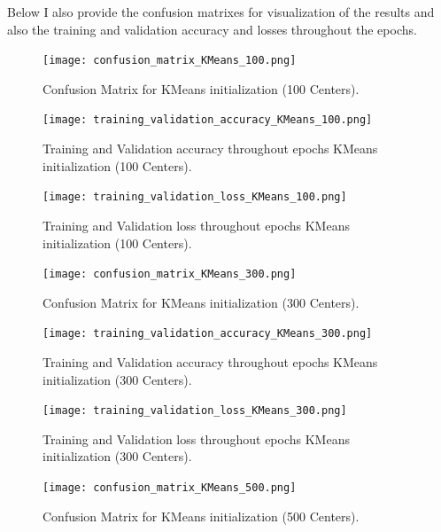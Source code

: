 \documentclass[lettersize,journal]{IEEEtran}
\begin{document}
Below I also provide the confusion matrixes for visualization of the results and also the training and validation accuracy and losses throughout the epochs.
\begin{figure}[H]
    \centering
    \texttt{[image: confusion\_matrix\_KMeans\_100.png]}
    \caption{Confusion Matrix for KMeans initialization (100 Centers).}
    \label{fig:confusion-matrix-KMeans100}
\end{figure}

\begin{figure}[H]
    \centering
    \texttt{[image: training\_validation\_accuracy\_KMeans\_100.png]}
    \caption{Training and Validation accuracy throughout epochs KMeans initialization (100 Centers).}
    \label{fig:TR100Centers}
\end{figure}

\begin{figure}[H]
    \centering
    \texttt{[image: training\_validation\_loss\_KMeans\_100.png]}
    \caption{Training and Validation loss throughout epochs KMeans initialization (100 Centers).}
    \label{fig:TR100Centersloss}
\end{figure}

\begin{figure}[H]
    \centering
    \texttt{[image: confusion\_matrix\_KMeans\_300.png]}
    \caption{Confusion Matrix for KMeans initialization (300 Centers).}
    \label{fig:confusion-matrix-KMeans300}
\end{figure}

\begin{figure}[H]
    \centering
    \texttt{[image: training\_validation\_accuracy\_KMeans\_300.png]}
    \caption{Training and Validation accuracy throughout epochs KMeans initialization (300 Centers).}
    \label{fig:TR300Centers}
\end{figure}

\begin{figure}[H]
    \centering
    \texttt{[image: training\_validation\_loss\_KMeans\_300.png]}
    \caption{Training and Validation loss throughout epochs KMeans initialization (300 Centers).}
    \label{fig:TR300Centersloss}
\end{figure}

\begin{figure}[H]
    \centering
    \texttt{[image: confusion\_matrix\_KMeans\_500.png]}
    \caption{Confusion Matrix for KMeans initialization (500 Centers).}
    \label{fig:confusion-matrix-KMeans500}
\end{figure}
\end{document}
